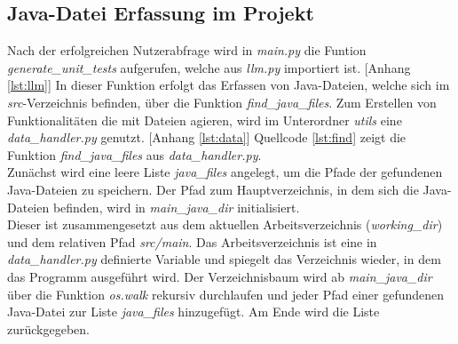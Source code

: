 \subsection{Java-Datei Erfassung im Projekt}
Nach der erfolgreichen Nutzerabfrage wird in \textit{main.py} die Funtion \textit{generate\_unit\_tests} aufgerufen, welche aus \textit{llm.py} importiert ist. [Anhang \ref{lst:llm}] In dieser Funktion erfolgt das Erfassen von Java-Dateien, welche sich im \textit{src}-Verzeichnis befinden, über die Funktion \textit{find\_java\_files}. Zum Erstellen von Funktionalitäten die mit Dateien agieren, wird im Unterordner \textit{utils} eine \textit{data\_handler.py} genutzt. [Anhang \ref{lst:data}] Quellcode \ref{lst:find} zeigt die Funktion \textit{find\_java\_files} aus \textit{data\_handler.py}.\\ Zunächst wird eine leere Liste \textit{java\_files} angelegt, um die Pfade der gefundenen Java-Dateien zu speichern. Der Pfad zum Hauptverzeichnis, in dem sich die Java-Dateien befinden, wird in \textit{main\_java\_dir} initialisiert. \\
\vspace{-.3cm}
Dieser ist zusammengesetzt aus dem aktuellen Arbeitsverzeichnis (\textit{working\_dir}) und dem relativen Pfad \textit{src/main}. Das Arbeitsverzeichnis ist eine in \textit{data\_handler.py} definierte Variable und spiegelt das Verzeichnis wieder, in dem das Programm ausgeführt wird. Der Verzeichnisbaum wird ab \textit{main\_java\_dir} über die Funktion \textit{os.walk} rekursiv durchlaufen und jeder Pfad einer gefundenen Java-Datei zur Liste \textit{java\_files} hinzugefügt. Am Ende wird die Liste zurückgegeben. 


